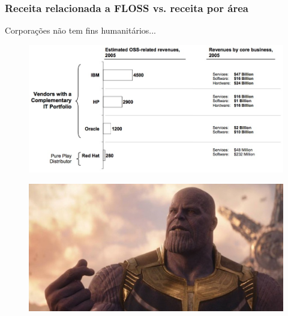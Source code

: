 \documentclass[xcolor=dvipsnames]{beamer}
\begin{document}
\begin{frame}
	\frametitle{Receita relacionada a FLOSS vs. receita por área}
	Corporações não tem fins humanitários... \pause
	\begin{figure}
	\begin{center}
 	\includegraphics[scale=0.75]{receita_floss.jpg}\\[0.3cm]
	\end{center}
	\end{figure}
\end{frame}

\begin{frame}
	\begin{figure}
	\begin{center}
 	\includegraphics[scale=0.65]{thanos.jpg}
	\end{center}
	\end{figure}
\end{frame}
\end{document}
